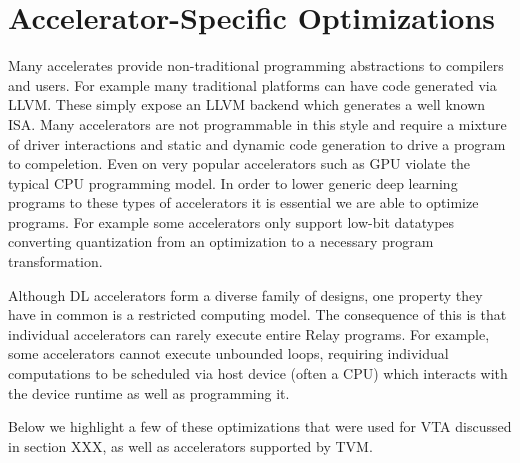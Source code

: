 
\section{Accelerator-Specific Optimizations}
\label{sec:accel-opts}

Many accelerates provide non-traditional programming
    abstractions to compilers and users.
For example many traditional platforms can have
    code generated via LLVM.
These simply expose an LLVM backend which generates
    a well known ISA.
Many accelerators are not programmable in this style
    and require a mixture of driver interactions
    and static and dynamic code generation to
    drive a program to compeletion.
Even on very popular accelerators such as GPU
    violate the typical CPU programming model.
In order to lower generic deep learning programs
    to these types of accelerators it is
    essential we are able to optimize programs.
For example some accelerators only support
    low-bit datatypes converting quantization
    from an optimization to a necessary program
    transformation.

Although DL accelerators form a diverse family of designs,
  one property they have in common is a restricted computing model.
The consequence of this is that individual accelerators
  can rarely execute entire Relay programs.
For example, some accelerators cannot execute unbounded loops,
  requiring individual computations to be scheduled via
  host device (often a CPU) which interacts with the device runtime
  as well as programming it.

Below we highlight a few of these optimizations that were used for
VTA discussed in section XXX, as well as accelerators supported by
TVM.

